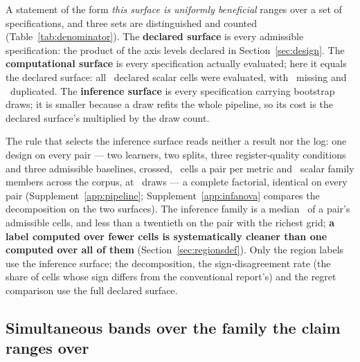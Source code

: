 A statement of the form \emph{this surface is uniformly beneficial} ranges
over a set of specifications, and three sets are distinguished and counted
(Table~\ref{tab:denominator}). The \textbf{declared surface} is every
admissible specification: the product of the axis levels declared in
Section~\ref{sec:design}. The \textbf{computational surface} is every
specification actually evaluated; here it equals the declared surface: all
\nDeclaredAdmissibleScalar\ declared scalar cells were evaluated, with
\nMissingCells\ missing and \nDuplicateCells\ duplicated. The
\textbf{inference surface} is every specification carrying bootstrap draws;
it is smaller because a draw refits the whole pipeline, so its cost is the
declared surface's multiplied by the draw count.

The rule that selects the inference surface reads neither a result nor the
log: one design on every pair --- two learners, two splits, three
register-quality conditions and three admissible baselines, crossed,
\nCellsPerDecomposition\ cells a pair per metric and \nInferenceScalar\
scalar family members across the corpus, at \nDrawsSurface\ draws --- a
complete factorial, identical on every pair (Supplement~\ref{app:pipeline};
Supplement~\ref{app:infanova} compares the decomposition on the two
surfaces). The inference family is a median
\inferenceShareAdmissibleMedianPct\ of a pair's admissible cells, and less
than a twentieth on the pair with the richest grid; \textbf{a label
computed over fewer cells is systematically cleaner than one computed over
all of them} (Section~\ref{sec:regionsdef}). Only the region labels use the
inference surface; the decomposition, the sign-disagreement rate (the share
of cells whose sign differs from the conventional report's) and the regret
comparison use the full declared surface.

\subsection{Simultaneous bands over the family the claim ranges over}
\label{sec:simbands}


